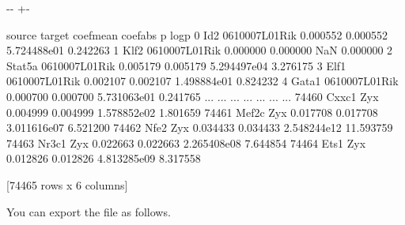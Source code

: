 \documentclass[letterpaper,10pt,english]{sphinxmanual}
\newlength\nbsphinxcodecellspacing
\begin{document}
{

\kern-\sphinxverbatimsmallskipamount\kern-\baselineskip
\kern+\FrameHeightAdjust\kern-\fboxrule
\vspace{\nbsphinxcodecellspacing}

%
\begin{sphinxVerbatim}[commandchars=\\\{\}]
\llap{\color{nbsphinxout}[11]:\,\hspace{\fboxrule}\hspace{\fboxsep}}       source         target  coef\PYGZus{}mean  coef\PYGZus{}abs             p      \PYGZhy{}logp
0         Id2  0610007L01Rik   0.000552  0.000552  5.724488e\PYGZhy{}01   0.242263
1        Klf2  0610007L01Rik   0.000000  0.000000           NaN  \PYGZhy{}0.000000
2      Stat5a  0610007L01Rik  \PYGZhy{}0.005179  0.005179  5.294497e\PYGZhy{}04   3.276175
3        Elf1  0610007L01Rik   0.002107  0.002107  1.498884e\PYGZhy{}01   0.824232
4       Gata1  0610007L01Rik  \PYGZhy{}0.000700  0.000700  5.731063e\PYGZhy{}01   0.241765
...       ...            ...        ...       ...           ...        ...
74460   Cxxc1            Zyx  \PYGZhy{}0.004999  0.004999  1.578852e\PYGZhy{}02   1.801659
74461   Mef2c            Zyx   0.017708  0.017708  3.011616e\PYGZhy{}07   6.521200
74462    Nfe2            Zyx   0.034433  0.034433  2.548244e\PYGZhy{}12  11.593759
74463   Nr3c1            Zyx  \PYGZhy{}0.022663  0.022663  2.265408e\PYGZhy{}08   7.644854
74464    Ets1            Zyx   0.012826  0.012826  4.813285e\PYGZhy{}09   8.317558

[74465 rows x 6 columns]
\end{sphinxVerbatim}
}

You can export the file as follows.

{
%
\begin{sphinxVerbatim}[commandchars=\\\{\}]
\llap{\color{nbsphinxin}[ ]:\,\hspace{\fboxrule}\hspace{\fboxsep}}
  

\PYG{p}{[}\PYG{p}{]}
\end{sphinxVerbatim}
}
\end{document}
